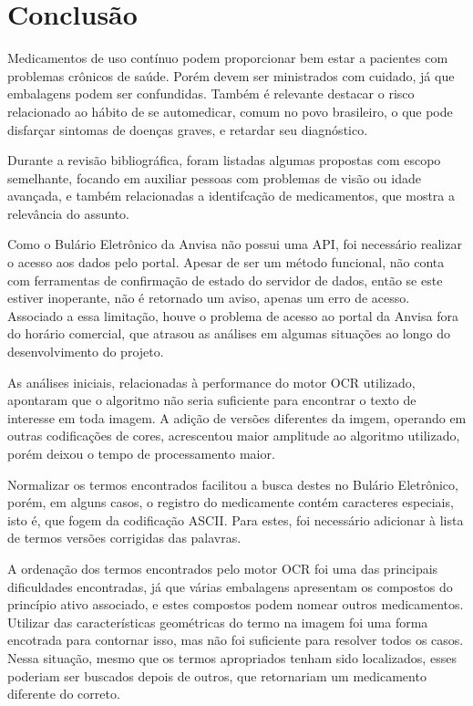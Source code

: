 \chapter{Conclusão}\label{cap:conclusao}

Medicamentos de uso contínuo podem proporcionar bem estar a pacientes com problemas crônicos de saúde.
Porém devem ser ministrados com cuidado, já que embalagens podem ser confundidas.
Também é relevante destacar o risco relacionado ao hábito de se automedicar, comum no povo brasileiro, o que pode disfarçar sintomas de doenças graves, e retardar seu diagnóstico.

Durante a revisão bibliográfica, foram listadas algumas propostas com escopo semelhante, focando em auxiliar pessoas com problemas de visão ou idade avançada, e também relacionadas a identifcação de medicamentos, que mostra a relevância do assunto.

Como o Bulário Eletrônico da \ac{Anvisa} não possui uma \ac{API}, foi necessário realizar o acesso aos dados pelo portal.
Apesar de ser um método funcional, não conta com ferramentas de confirmação de estado do servidor de dados, então se este estiver inoperante, não é retornado um aviso, apenas um erro de acesso.
Associado a essa limitação, houve o problema de acesso ao portal da \ac{Anvisa} fora do horário comercial, que atrasou as análises em algumas situações ao longo do desenvolvimento do projeto.

As análises iniciais, relacionadas à performance do motor \ac{OCR} utilizado, apontaram que o algoritmo não seria suficiente para encontrar o texto de interesse em toda imagem.
A adição de versões diferentes da imgem, operando em outras codificações de cores, acrescentou maior amplitude ao algoritmo utilizado, porém deixou o tempo de processamento maior.

Normalizar os termos encontrados facilitou a busca destes no Bulário Eletrônico, porém, em alguns casos, o registro do medicamente contém caracteres especiais, isto é, que fogem da codificação \ac{ASCII}.
Para estes, foi necessário adicionar à lista de termos versões corrigidas das palavras.

A ordenação dos termos encontrados pelo motor \ac{OCR} foi uma das principais dificuldades encontradas, já que várias embalagens apresentam os compostos do princípio ativo associado, e estes compostos podem nomear outros medicamentos.
Utilizar das características geométricas do termo na imagem foi uma forma encotrada para contornar isso, mas não foi suficiente para resolver todos os casos.
Nessa situação, mesmo que os termos apropriados tenham sido localizados, esses poderiam ser buscados depois de outros, que retornariam um medicamento diferente do correto.

